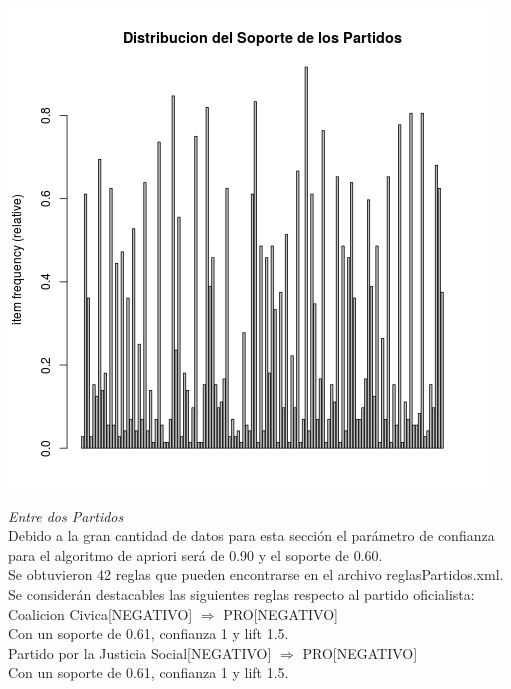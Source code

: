 \documentclass{endm}
\begin{document}
\begin{center}
\includegraphics[scale=0.4]{graficos/soportesPartidos.png} \\
\end{center}

\textit{Entre dos Partidos} \\

Debido a la gran cantidad de datos para esta sección el parámetro de confianza para el algoritmo de apriori será de 0.90 y el soporte de 0.60. \\

Se obtuvieron 42 reglas que pueden encontrarse en el archivo reglasPartidos.xml.  \\

Se considerán destacables las siguientes reglas respecto al partido oficialista: \\

{Coalicion Civica[NEGATIVO]} $\Longrightarrow$ {PRO[NEGATIVO]} \\

Con un soporte de 0.61, confianza 1 y lift 1.5.\\

{Partido por la Justicia Social[NEGATIVO]} $\Longrightarrow$ {PRO[NEGATIVO]} \\

Con un soporte de 0.61, confianza 1 y lift 1.5.\\
\end{document}
